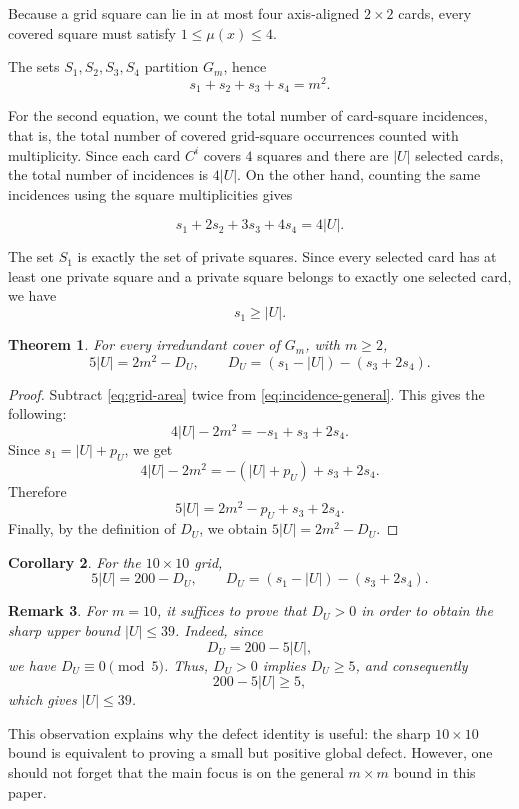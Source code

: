 \documentclass[11pt]{article}
\newtheorem{theorem}{Theorem}[section]
\newtheorem{corollary}[theorem]{Corollary}
\newtheorem{remark}[theorem]{Remark}
\begin{document}
	\label{sec:defect-identity}
	
	Because a grid square can lie in at most four axis-aligned \(2\times2\) cards, every covered square must satisfy $1\le\mu(x)\le4.$
	
	The sets \(S_1,S_2,S_3,S_4\) partition \(G_m\), hence
	\begin{equation}
		s_1+s_2+s_3+s_4=m^2.
		\label{eq:grid-area}
	\end{equation}
	
	For the second equation, we count the total number of card-square incidences, that is, the total number of covered grid-square occurrences counted with multiplicity. Since each card \(C^i\) covers \(4\) squares and there are \(|U|\) selected cards, the total number of incidences is \(4|U|\). On the other hand, counting the same incidences using the square multiplicities gives
	
	
	\begin{equation}
		s_1+2s_2+3s_3+4s_4=4|U|.
		\label{eq:incidence-general}
	\end{equation}
	
	The set \(S_1\) is exactly the set of private squares. Since every selected card has at least one private square and a private square belongs to exactly one selected card, we have
	\[
	s_1\ge |U|.
	\]
	
	\begin{theorem}
		For every irredundant cover of \(G_m\), with \(m\ge2\),
		\[
		{
			5|U|=2m^2-D_U,
			\qquad
			D_U=(s_1-|U|)-(s_3+2s_4).
		}
		\]
		\label{D_U theo}
	\end{theorem}
	
	\begin{proof}
		Subtract \eqref{eq:grid-area} twice from
		\eqref{eq:incidence-general}. This gives the following:
		\[
		4|U|-2m^2=-s_1+s_3+2s_4.
		\]
		Since \(s_1=|U|+p_U\), we get
		\[
		4|U|-2m^2=-(|U|+p_U)+s_3+2s_4.
		\]
		Therefore
		\[
		5|U|=2m^2-p_U+s_3+2s_4.
		\]
		Finally, by the definition of \(D_U\), we obtain \(5|U|=2m^2-D_U\).
	\end{proof}
	
	\begin{corollary}
		For the \(10\times10\) grid,
		\[
		5|U|=200-D_U,
		\qquad
		D_U=(s_1-|U|)-(s_3+2s_4).
		\]
	\end{corollary}
	
	\begin{remark}
		For \(m=10\), it suffices to prove that \(D_U>0\) in order to obtain the sharp upper bound \(|U|\le 39\). Indeed, since
		\[
		D_U=200-5|U|,
		\]
		we have \(D_U\equiv 0 \pmod{5}\). Thus, \(D_U>0\) implies \(D_U\ge 5\), and consequently
		\[
		200-5|U|\ge 5,
		\]
		which gives \(|U|\le 39\).
	\end{remark}
	This observation explains why the defect identity is useful: the sharp \(10\times10\) bound is equivalent to proving a small but positive global defect. However, one should not forget that the main focus is on the general \(m \times m\) bound in this paper.
	
\end{document}
